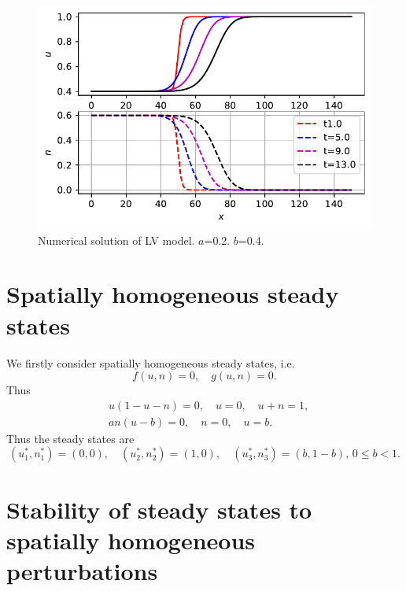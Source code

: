 \documentclass[
  letterpaper,
  DIV=11,
  numbers=noendperiod]{scrreprt}
\theoremstyle{plain}
\theoremstyle{definition}
\theoremstyle{plain}
\theoremstyle{remark}
\begin{document}
\begin{figure}

{\centering \includegraphics{LotkaVolteraPDE_files/figure-pdf/fig-lvpde-output-1.pdf}

}

\caption{\label{fig-lvpde}Numerical solution of LV model. \(a\)=0.2.
\(b\)=0.4.}

\end{figure}

\hypertarget{spatially-homogeneous-steady-states}{%
\section{Spatially homogeneous steady
states}\label{spatially-homogeneous-steady-states}}

We firstly consider spatially homogeneous steady states, i.e. \[
f(u,n) =0, \quad g(u,n) = 0.
\] Thus \[
\begin{aligned}
 &u(1-u-n) = 0,  \quad  u =0, \quad u+n=1,\\
 & an(u-b) = 0,  \quad n =0, \quad u =b.
 \end{aligned}
\] Thus the steady states are \[
 (u_1^\ast, n_1^\ast)= (0,0), \quad (u_2^\ast, n_2^\ast)= (1,0), \quad (u_3^\ast, n_3^\ast)= (b,1-b), \, 0\leq b <1.
\]

\hypertarget{stability-of-steady-states-to-spatially-homogeneous-perturbations}{%
\section{Stability of steady states to spatially homogeneous
perturbations}\label{stability-of-steady-states-to-spatially-homogeneous-perturbations}}
\end{document}
